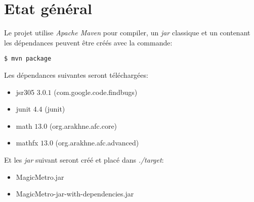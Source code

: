 \documentclass[report, backcover, french, nodocumentinfo]{upmethodology-document}
\begin{document}
	\upmdocumentsummary{}
	\upmdocumentauthors{}
	\upmdocumentinformedpeople{}
	\upmpublicationpage{}

	\newpage{}
	\section{Etat général}
		\p{}
			Le projet utilise \textit{Apache Maven} pour compiler, un \textit{jar} classique et un contenant les dépendances peuvent être créés avec la commande:
			\begin{Verbatim}[frame=single]
$ mvn package
			\end{Verbatim}
			Les dépendances suivantes seront téléchargées:
			\begin{itemize}
				\item jsr305 $3.0.1$ (com.google.code.findbugs)
				\item junit $4.4$ (junit)
				\item math $13.0$ (org.arakhne.afc.core)
				\item mathfx $13.0$ (org.arakhne.afc.advanced)
			\end{itemize}
			Et les \textit{jar} suivant seront créé et placé dans \textit{./target}:
			\begin{itemize}
				\item MagicMetro.jar
				\item MagicMetro-jar-with-dependencies.jar
			\end{itemize}
\end{document}
